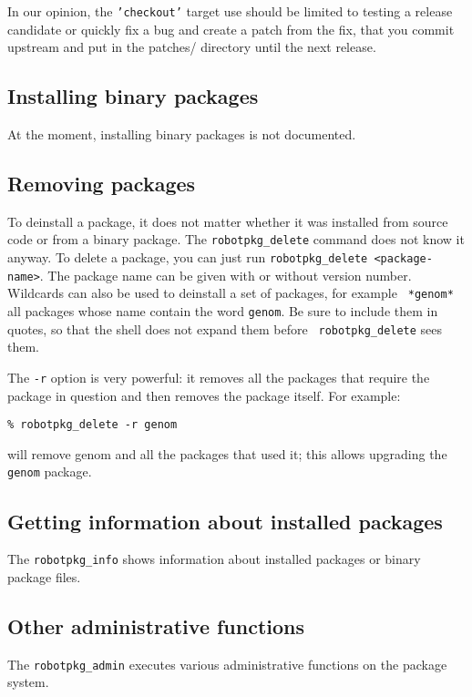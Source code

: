In our opinion, the {\tt 'checkout'}  target use should be limited to testing a
release candidate or  quickly fix a bug  and create a patch from  the fix, that
you commit upstream and put in the patches/ directory until the next release.


\subsection{Installing binary packages} %

At the moment, installing binary packages is not documented.


\subsection{Removing packages} %

To deinstall a package, it does not matter whether it was installed from source
code or  from a  binary package.  The  {\tt robotpkg\_delete} command  does not
know it  anyway.  To delete a  package, you can just  run {\tt robotpkg\_delete
<package-name>}.  The package name can be given with or without version number.
Wildcards can  also be used  to deinstall a  set of packages, for  example {\tt
*genom*} all  packages whose  name contain  the word {\tt  genom}.  Be  sure to
include them  in quotes,  so that the  shell does  not expand them  before {\tt
robotpkg\_delete} sees them.

The {\tt -r} option is very powerful: it  removes all the packages that require
the package in question and then removes the package itself. For example:

\begin{verbatim}
% robotpkg_delete -r genom
\end{verbatim}

will remove genom and all the packages that used it; this allows
upgrading the {\tt genom} package.


\subsection{Getting information about installed packages} %

The {\tt  robotpkg\_info} shows information about installed  packages or binary
package files.


\subsection{Other administrative functions} %

The  {\tt robotpkg\_admin}  executes  various administrative  functions on  the
package system.

